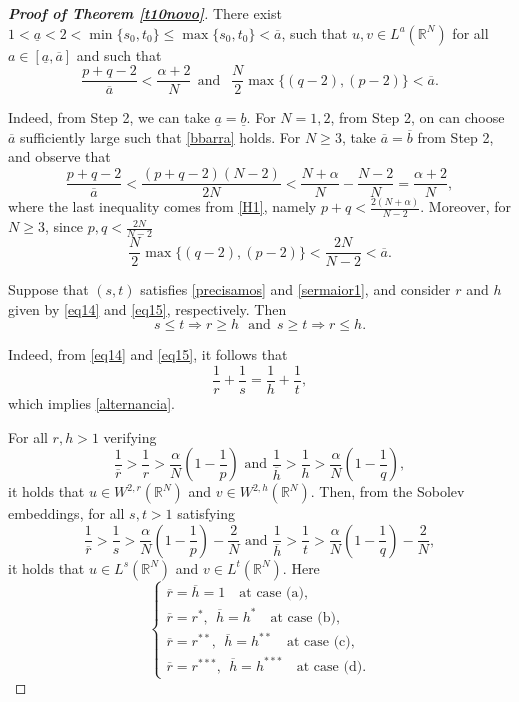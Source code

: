\documentclass[12pt,a4paper]{article}
\numberwithin{equation}{section}
\begin{document}
\begin{proof}[\bf{Proof of Theorem \ref{t10novo}}]
 There exist $1  < \underline{a} <2 < \min\{s_0, t_0\} \leq \max\{s_0, t_0\}< \overline{a} $, such that $u, v \in L^{a}(\mathbb{R}^N)$ for all $a\in [\underline{a}, \overline{a}]$ and such that
\begin{equation}\label{bbarra}
\dfrac{p+q-2}{\overline{a}} < \frac{\alpha+2}{N} \ \ \text{and }\ \ \dfrac{N}{2}\max\{(q-2), (p-2)\} < \overline{a}. 
\end{equation}

Indeed, from Step 2, we can take $\underline{a} = \underline{b}$. For $N=1,2$, from Step 2, on can choose $\overline{a}$ sufficiently large such that \eqref{bbarra} holds. For $N\geq 3$, take $\overline{a} = \overline{b}$ from Step 2, and observe that
\[
\dfrac{p+q-2}{\overline{a}} < \dfrac{(p+q-2)(N-2)}{2N} < \dfrac{N+\alpha}{N} - \dfrac{N-2}{N}= \dfrac{\alpha+2}{N},
\]
where the last inequality comes from \eqref{H1}, namely $p+q< \frac{2(N+\alpha)}{N-2}$. Moreover, for $N\geq 3$, since $p,q < \frac{2N}{N-2}$
\[
\dfrac{N}{2}\max\{(q-2), (p-2)\} < \dfrac{2N}{N-2} < \overline{a}.
\]

\medbreak 

 Suppose that $(s,t)$ satisfies \eqref{precisamos} and \eqref{sermaior1}, and consider $r$ and $h$ given by \eqref{eq14} and \eqref{eq15}, respectively. Then
\begin{equation}\label{alternancia}
s \leq t \Longrightarrow r\geq h \ \ \ \text{and} \ \ s \geq t \Longrightarrow r \leq h.
\end{equation}



Indeed, from \eqref{eq14} and \eqref{eq15}, it follows that
\[
\dfrac{1}{r} + \dfrac{1}{s} = \dfrac{1}{h} + \dfrac{1}{t},
\]
which implies \eqref{alternancia}.

\medbreak

 For all $r, h>1$ verifying
 $$
\dfrac{1}{\overline{r}}> \dfrac{1}{r}> \dfrac{\alpha}{N}\left(1-\dfrac{1}{p}\right)  \mbox{ \ \ \ and \ \ \ } \dfrac{1}{\overline{h}}> \dfrac{1}{h}> \dfrac{\alpha}{N}\left(1-\dfrac{1}{q}\right),
 $$
it holds that $u\in W^{2, r}(\mathbb{R}^N)$ and $v\in W^{2, h}(\mathbb{R}^N)$. Then, from the Sobolev embeddings, for all $s, t>1$ satisfying
 $$
\dfrac{1}{\overline{r}} > \dfrac{1}{s}> \dfrac{\alpha}{N}\left(1-\dfrac{1}{p}\right)-\dfrac{2}{N} \mbox{ \ \ \ and \ \ \ }  \dfrac{1}{\overline{h}}> \dfrac{1}{t}> \dfrac{\alpha}{N}\left(1-\dfrac{1}{q}\right)-\dfrac{2}{N},
 $$
 it holds that $u\in L^{s}(\mathbb{R}^N)$ and $v\in L^{t}(\mathbb{R}^N)$.  Here
 \[
\begin{cases}
\overline{r} =\overline{h} = 1 \quad \text{at case (a),}\\
\overline{r}= r^{\ast}, \ \ \overline{h}= h^{\ast} \quad\text{at case (b),}\\
\overline{r}= r^{\ast \ast}, \ \ \overline{h}= h^{\ast \ast} \quad\text{at case (c),}\\ 
\overline{r}=  r^{\ast \ast \ast}, \ \ \overline{h}=  h^{\ast \ast \ast} \quad\text{at case (d).}
\end{cases}
\]


\end{proof}
\end{document}
